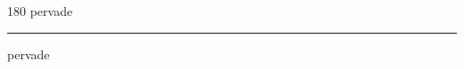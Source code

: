 
\begin{frame}
\begin{center}
\begin{turn}{180}
{\fontsize{2.5cm}{1em}\selectfont pervade}
\end{turn}
\vspace{1em}\par  
\hrule
\vspace{1em}\par  
{\fontsize{2.5cm}{1em}\selectfont pervade}
\end{center}
\end{frame}
